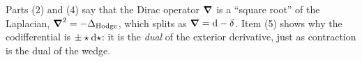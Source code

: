 \begin{remark}
Parts (2) and (4) say that the Dirac operator $\boldsymbol{\nabla}$ is a ``square root'' of the Laplacian, $\boldsymbol{\nabla}^2=-\Delta_{\mathrm{Hodge}}$, which splits as $\boldsymbol{\nabla}=\mathrm{d}-\delta$. Item (5) shows why the codifferential is $\pm\star\mathrm{d}\star$: it is the \emph{dual} of the exterior derivative, just as contraction is the dual of the wedge.
\end{remark}
